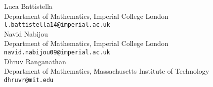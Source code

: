 \documentclass[11pt]{amsart}
\theoremstyle{definition}
\theoremstyle{definition}
\begin{document}
\bigskip\bigskip

\noindent Luca Battistella\\
Department of Mathematics, Imperial College London \\
\texttt{l.battistella14@imperial.ac.uk}\\

\noindent Navid Nabijou \\
Department of Mathematics, Imperial College London \\
\texttt{navid.nabijou09@imperial.ac.uk}\\

\noindent Dhruv Ranganathan \\
Department of Mathematics, Massachusetts Institute of Technology \\
\texttt{dhruvr@mit.edu}
\end{document}
